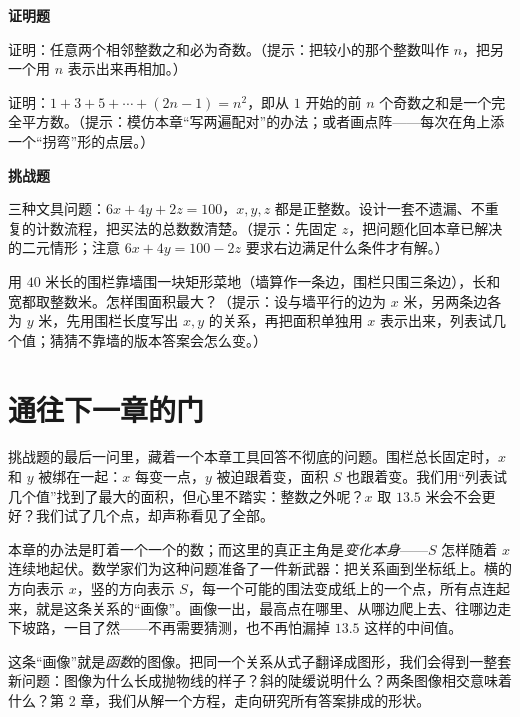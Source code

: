 \textbf{证明题}

\begin{sikao}
\item 证明：任意两个相邻整数之和必为奇数。（提示：把较小的那个整数叫作 $n$，把另一个用 $n$ 表示出来再相加。）
\item 证明：$1+3+5+\cdots+(2n-1)=n^2$，即从 $1$ 开始的前 $n$ 个奇数之和是一个完全平方数。（提示：模仿本章“写两遍配对”的办法；或者画点阵——每次在角上添一个“拐弯”形的点层。）
\end{sikao}

\textbf{挑战题}

\begin{sikao}
\item 三种文具问题：$6x+4y+2z=100$，$x,y,z$ 都是正整数。设计一套不遗漏、不重复的计数流程，把买法的总数数清楚。（提示：先固定 $z$，把问题化回本章已解决的二元情形；注意 $6x+4y=100-2z$ 要求右边满足什么条件才有解。）
\item 用 $40$ 米长的围栏靠墙围一块矩形菜地（墙算作一条边，围栏只围三条边），长和宽都取整数米。怎样围面积最大？（提示：设与墙平行的边为 $x$ 米，另两条边各为 $y$ 米，先用围栏长度写出 $x,y$ 的关系，再把面积单独用 $x$ 表示出来，列表试几个值；猜猜不靠墙的版本答案会怎么变。）
\end{sikao}

\section*{通往下一章的门}

挑战题的最后一问里，藏着一个本章工具回答不彻底的问题。围栏总长固定时，$x$ 和 $y$ 被绑在一起：$x$ 每变一点，$y$ 被迫跟着变，面积 $S$ 也跟着变。我们用“列表试几个值”找到了最大的面积，但心里不踏实：整数之外呢？$x$ 取 $13.5$ 米会不会更好？我们试了几个点，却声称看见了全部。

本章的办法是盯着一个一个的数；而这里的真正主角是\emph{变化本身}——$S$ 怎样随着 $x$ 连续地起伏。数学家们为这种问题准备了一件新武器：把关系画到坐标纸上。横的方向表示 $x$，竖的方向表示 $S$，每一个可能的围法变成纸上的一个点，所有点连起来，就是这条关系的“画像”。画像一出，最高点在哪里、从哪边爬上去、往哪边走下坡路，一目了然——不再需要猜测，也不再怕漏掉 $13.5$ 这样的中间值。

这条“画像”就是\emph{函数}的图像。把同一个关系从式子翻译成图形，我们会得到一整套新问题：图像为什么长成抛物线的样子？斜的陡缓说明什么？两条图像相交意味着什么？第 2 章，我们从解一个方程，走向研究所有答案排成的形状。
